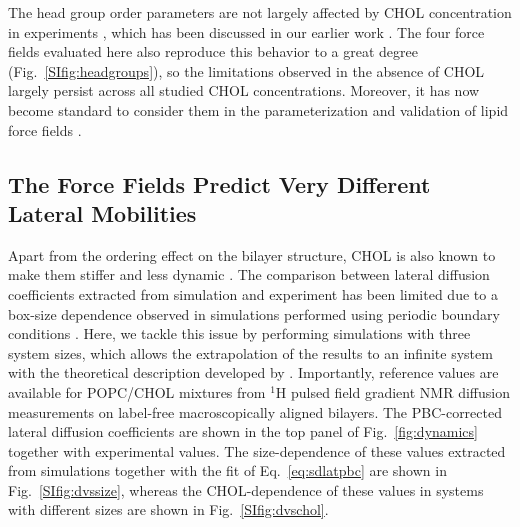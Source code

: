 \documentclass[journal=jctcce]{achemso}
\begin{document}
The head group order parameters are not largely affected by CHOL concentration in experiments \cite{ferreira13}, which has been discussed in our earlier work \cite{botan15}. The four force fields evaluated here also reproduce this behavior to a great degree (Fig.~\ref{SIfig:headgroups}), so the limitations observed in the absence of CHOL \cite{botan15} largely persist across all studied CHOL concentrations. Moreover, it has now become standard to consider them in the parameterization and validation of lipid force fields \cite{dickson2022lipid21,grote2020optimization,yu2021charmm36,yu2021semi}.


\subsection{The Force Fields Predict Very Different Lateral Mobilities}

Apart from the ordering effect on the bilayer structure, CHOL is also known to make them stiffer and less dynamic \cite{rog2009ordering,filippov2003effect,filippov2003influence}. The comparison between lateral diffusion coefficients extracted from simulation and experiment has been limited due to a box-size dependence observed in simulations performed using periodic boundary conditions \cite{vogele2016divergent,vogele2018hydrodynamics,camley2015strong}. Here, we tackle this issue by performing simulations with three system sizes, which allows the extrapolation of the results to an infinite system with the theoretical description developed by \citeauthor{vogele2016divergent} \cite{vogele2018hydrodynamics,vogele2018hydrodynamics}. Importantly, reference values are available for POPC/CHOL mixtures from $^1$H pulsed field gradient NMR diffusion measurements on label-free macroscopically aligned bilayers. The PBC-corrected lateral diffusion coefficients are shown in the top panel of Fig.~\ref{fig:dynamics} together with experimental values. The size-dependence of these values extracted from simulations together with the fit of Eq.~\eqref{eq:sdlatpbc} are shown in Fig.~\ref{SIfig:dvssize}, whereas the CHOL-dependence of these values in systems with different sizes are shown in Fig.~\ref{SIfig:dvschol}. 
\end{document}
